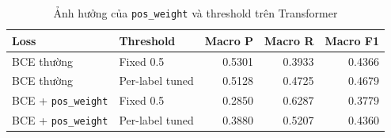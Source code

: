 \begin{table}[H]
\centering
\small
\begin{tabular}{llrrr}
\toprule
\textbf{Loss} & \textbf{Threshold} & \textbf{Macro P} & \textbf{Macro R} & \textbf{Macro F1} \\
\midrule
BCE thường & Fixed 0.5 & 0.5301 & 0.3933 & 0.4366 \\
BCE thường & Per-label tuned & 0.5128 & 0.4725 & 0.4679 \\
BCE + \texttt{pos\_weight} & Fixed 0.5 & 0.2850 & 0.6287 & 0.3779 \\
BCE + \texttt{pos\_weight} & Per-label tuned & 0.3880 & 0.5207 & 0.4360 \\
\bottomrule
\end{tabular}
\caption{Ảnh hưởng của \texttt{pos\_weight} và threshold trên Transformer}
\label{tab:pos-weight-results}
\end{table}
